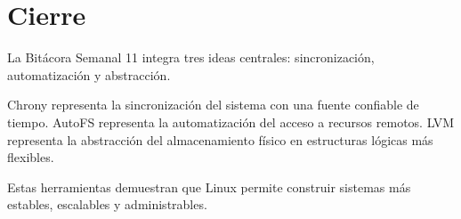 \documentclass[11pt, letterpaper]{article}
\begin{document}
\section{Cierre}
\label{sec:org1579b22}

La Bitácora Semanal 11 integra tres ideas centrales: sincronización, automatización y abstracción.

Chrony representa la sincronización del sistema con una fuente confiable de tiempo. AutoFS representa la automatización del acceso a recursos remotos. LVM representa la abstracción del almacenamiento físico en estructuras lógicas más flexibles.

Estas herramientas demuestran que Linux permite construir sistemas más estables, escalables y administrables.
\end{document}
